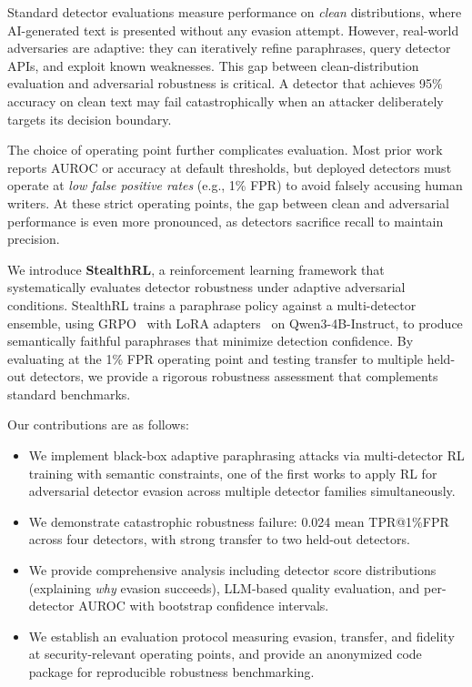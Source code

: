 \documentclass[11pt]{article}
\begin{document}
Standard detector evaluations measure performance on \emph{clean} distributions, where AI-generated text is presented without any evasion attempt. However, real-world adversaries are adaptive: they can iteratively refine paraphrases, query detector APIs, and exploit known weaknesses. This gap between clean-distribution evaluation and adversarial robustness is critical. A detector that achieves 95\% accuracy on clean text may fail catastrophically when an attacker deliberately targets its decision boundary.

The choice of operating point further complicates evaluation. Most prior work reports AUROC or accuracy at default thresholds, but deployed detectors must operate at \emph{low false positive rates} (e.g., 1\% FPR) to avoid falsely accusing human writers. At these strict operating points, the gap between clean and adversarial performance is even more pronounced, as detectors sacrifice recall to maintain precision.

We introduce \textbf{StealthRL}, a reinforcement learning framework that systematically evaluates detector robustness under adaptive adversarial conditions. StealthRL trains a paraphrase policy against a multi-detector ensemble, using GRPO~\cite{pang2025grpo} with LoRA adapters~\cite{hu2021loralowrankadaptationlarge} on Qwen3-4B-Instruct, to produce semantically faithful paraphrases that minimize detection confidence. By evaluating at the 1\% FPR operating point and testing transfer to multiple held-out detectors, we provide a rigorous robustness assessment that complements standard benchmarks.

Our contributions are as follows:
\begin{itemize}[leftmargin=*,itemsep=2pt]
  \item We implement black-box adaptive paraphrasing attacks via multi-detector RL training with semantic constraints, one of the first works to apply RL for adversarial detector evasion across multiple detector families simultaneously.
  \item We demonstrate catastrophic robustness failure: 0.024 mean TPR@1\%FPR across four detectors, with strong transfer to two held-out detectors.
  \item We provide comprehensive analysis including detector score distributions (explaining \emph{why} evasion succeeds), LLM-based quality evaluation, and per-detector AUROC with bootstrap confidence intervals.
  \item We establish an evaluation protocol measuring evasion, transfer, and fidelity at security-relevant operating points, and provide an anonymized code package for reproducible robustness benchmarking.
\end{itemize}
\end{document}

